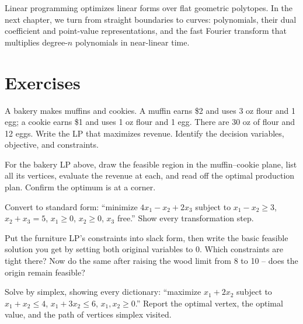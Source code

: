 Linear programming optimizes linear forms over flat geometric polytopes. In the next chapter, we turn from straight boundaries to curves: polynomials, their dual coefficient and point-value representations, and the fast Fourier transform that multiplies degree-$n$ polynomials in near-linear time.

\section*{Exercises}

\begin{exercise}[Model it]
A bakery makes muffins and cookies. A muffin earns \$2 and uses 3 oz flour and
1 egg; a cookie earns \$1 and uses 1 oz flour and 1 egg. There are 30 oz of
flour and 12 eggs. Write the LP that maximizes revenue. Identify the decision
variables, objective, and constraints.
\end{exercise}

\begin{exercise}
For the bakery LP above, draw the feasible region in the muffin--cookie plane,
list all its vertices, evaluate the revenue at each, and read off the optimal
production plan. Confirm the optimum is at a corner.
\end{exercise}

\begin{exercise}
Convert to standard form: ``minimize $4x_1 - x_2 + 2x_3$ subject to
$x_1 - x_2 \ge 3$, $x_2 + x_3 = 5$, $x_1 \ge 0$, $x_2 \ge 0$, $x_3$ free.''
Show every transformation step.
\end{exercise}

\begin{exercise}
Put the furniture LP's constraints into slack form, then write the basic
feasible solution you get by setting both original variables to 0. Which
constraints are tight there? Now do the same after raising the wood limit from
8 to 10 -- does the origin remain feasible?
\end{exercise}

\begin{exercise}
Solve by simplex, showing every dictionary:
``maximize $x_1 + 2x_2$ subject to $x_1 + x_2 \le 4$, $x_1 + 3x_2 \le 6$,
$x_1, x_2 \ge 0$.'' Report the optimal vertex, the optimal value, and the path
of vertices simplex visited.
\end{exercise}

